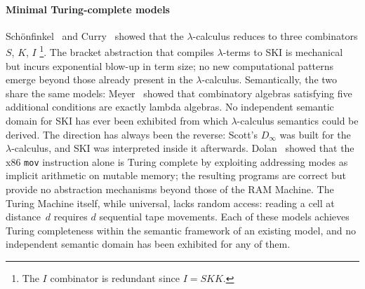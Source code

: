 \paragraph{Minimal Turing-complete models}
Sch\"onfinkel~\cite{schonfinkel1924-combinatory-logic} and
Curry~\cite{curry1958-combinatory-logic} showed that the
$\lambda$-calculus reduces to three combinators $S$, $K$, $I$
\footnote{
  The $I$ combinator is redundant since $I = SKK$.
}.
The bracket abstraction that compiles $\lambda$-terms to SKI
is mechanical but incurs exponential blow-up in term size;
no new computational patterns emerge beyond those already
present in the $\lambda$-calculus.
Semantically, the two share the same models:
Meyer~\cite{meyer1982-model-of-lambda-calculus} showed that combinatory algebras
satisfying five additional conditions are exactly lambda
algebras.
No independent semantic domain for SKI has ever been
exhibited from which $\lambda$-calculus semantics could be
derived. The direction has always been the reverse:
Scott's $D_\infty$ was built for the $\lambda$-calculus,
and SKI was interpreted inside it afterwards.
Dolan~\cite{dolan2013-mov-turing-complete} showed that the x86 \texttt{mov}
instruction alone is Turing complete by exploiting
addressing modes as implicit arithmetic on mutable memory;
the resulting programs are correct but provide no
abstraction mechanisms beyond those of the RAM Machine.
The Turing Machine itself, while universal, lacks random
access: reading a cell at distance~$d$ requires $d$
sequential tape movements.
Each of these models achieves Turing completeness
within the semantic framework of an existing model,
and no independent semantic domain has been exhibited
for any of them.

